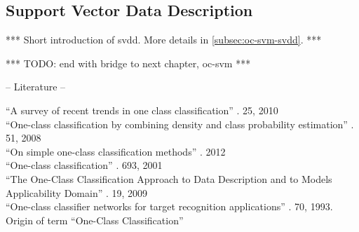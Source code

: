 \subsection{Support Vector Data Description}\label{subsec:occ-svdd}
*** Short introduction of \gls{svdd}. More details in \ref{subsec:oc-svm-svdd}. ***

*** TODO: end with bridge to next chapter, \gls{oc-svm} ***

-- Literature --

``A survey of recent trends in one class classification'' \cite{khan2010survey}. 25, 2010 \\

``One-class classification by combining density and class probability estimation'' \cite{hempstalk2008one}. 51, 2008 \\

``On simple one-class classification methods'' \cite{noumir2012simple}. 2012 \\

``One-class classification'' \cite{tax2001one}. 693, 2001 \\

``The One-Class Classification Approach to Data Description and to Models Applicability Domain'' \cite{baskin2010one}. 19, 2009 \\

``One-class classifier networks for target recognition applications'' \cite{moya1993one}. 70, 1993. Origin of term ``One-Class Classification'' \\